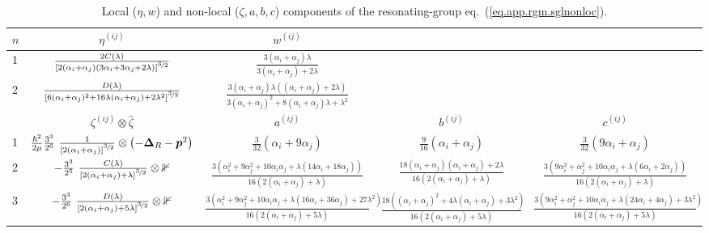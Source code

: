 \documentclass[aps,onecolumn,preprintnumbers,amsmath,amssymb,nofootinbib,superscriptaddress,notitlepage]{revtex4-1}
\newcommand{\eref}[1]{eq.~(\ref{#1})}
\newcommand{\ve}[1]{\ensuremath{\boldsymbol{#1}}}
\newcommand{\cc}{\ensuremath C(\lambda)}
\newcommand{\dd}{\ensuremath D(\lambda)}
\newcommand{\hbstwom}{\ensuremath \frac{\hbar^2}{2\mu}}
\begin{document}
\setlength{\tabcolsep}{4pt}
\renewcommand{\arraystretch}{1.6}
\begin{table}
\begin{tabular}{l|c|c|c|c}
$n$ & $\eta^{(ij)}$  & $w^{(ij)}$ & & \\\hline
1   & $\frac{2\cc}{\left[2(\alpha_i+\alpha_j)(3\alpha_i+3\alpha_j+2\lambda)\right]^{\nicefrac{3}{2}}}$ & 
      $\frac{3(\alpha_i+\alpha_j)\lambda}{3(\alpha_i+\alpha_j)+2\lambda}$ &  &  \\
2   & $\frac{\dd}{\left[6(\alpha_i+\alpha_j)^2+16\lambda(\alpha_i+\alpha_j)+2\lambda^2\right]^{\nicefrac{3}{2}}}$ & 
      $\frac{3(\alpha_i+\alpha_j)\lambda((\alpha_i+\alpha_j)+2\lambda)}{3(\alpha_i+\alpha_j)^2+8(\alpha_i+\alpha_j)\lambda+\lambda^2}$ &  &  \\
\hline\hline
           & $\zeta^{(ij)}\otimes\hat{\zeta}$ & $a^{(ij)}$ & $b^{(ij)}$ & $c^{(ij)}$ \\\hline
1   & $\hbstwom\frac{3^3}{2^6}~\frac{1}{\left[2(\alpha_i+\alpha_j)\right]^{\nicefrac{3}{2}}}\otimes\left(-\ve{\Delta}_R-\ve{p}^2\right)$ &
      $\frac{3}{32}(\alpha_i+9\alpha_j)$ & 
      $\frac{9}{16}(\alpha_i+\alpha_j)$ & 
      $\frac{3}{32}(9\alpha_i+\alpha_j)$ \\
2   & $-\frac{3^3}{2^5}~\frac{\cc}{\left[2(\alpha_i+\alpha_j)+\lambda\right]^{\nicefrac{3}{2}}}\otimes\mathbb{1}$ & 
      $\frac{3(\alpha_i^2+9\alpha_j^2+10\alpha_i\alpha_j+\lambda(14\alpha_i+18\alpha_j))}{16(2(\alpha_i+\alpha_j)+\lambda)}$ & 
      $\frac{18(\alpha_i+\alpha_j)(\alpha_i+\alpha_j)+2\lambda}{16(2(\alpha_i+\alpha_j)+\lambda)}$ & 
      $\frac{3(9\alpha_i^2+\alpha_j^2+10\alpha_i\alpha_j+\lambda(6\alpha_i+2\alpha_j))}{16(2(\alpha_i+\alpha_j)+\lambda)}$  \\
3   & $-\frac{3^3}{2^6}~\frac{\dd}{\left[2(\alpha_i+\alpha_j)+5\lambda\right]^{\nicefrac{3}{2}}}\otimes\mathbb{1}$ & 
      $\frac{3(\alpha_i^2+9\alpha_j^2+10\alpha_i\alpha_j+\lambda(16\alpha_i+36\alpha_j)+27\lambda^2)}{16(2(\alpha_i+\alpha_j)+5\lambda)}$ & 
      $\frac{18((\alpha_i+\alpha_j)^2+4\lambda(\alpha_i+\alpha_j)+3\lambda^2)}{16(2(\alpha_i+\alpha_j)+5\lambda)}$ & 
      $\frac{3(9\alpha_i^2+\alpha_j^2+10\alpha_i\alpha_j+\lambda(24\alpha_i+4\alpha_j)+3\lambda^2)}{16(2(\alpha_i+\alpha_j)+5\lambda)}$  \\
\hline\hline
\end{tabular}
\caption{\small{Local ($\eta,w$) and non-local ($\zeta,a,b,c$) components of the resonating-group \eref{eq.app.rgm.sglnonloc}.}}
\label{tab.app.pot.coffs}
\end{table}
\end{document}
